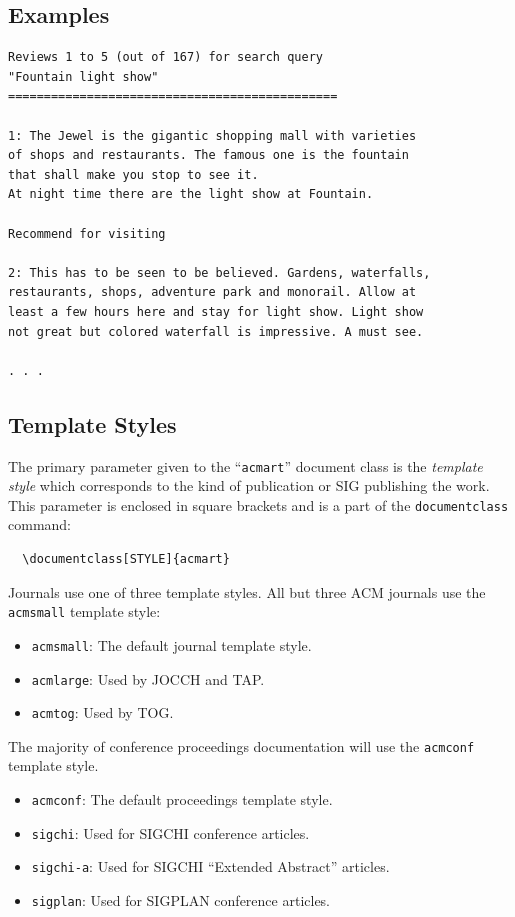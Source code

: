 \documentclass[sigconf,nonacm=true]{acmart}
\begin{document}
\subsection{Examples}
\begin{verbatim}
Reviews 1 to 5 (out of 167) for search query 
"Fountain light show"
==============================================

1: The Jewel is the gigantic shopping mall with varieties
of shops and restaurants. The famous one is the fountain 
that shall make you stop to see it.  
At night time there are the light show at Fountain.

Recommend for visiting

2: This has to be seen to be believed. Gardens, waterfalls,
restaurants, shops, adventure park and monorail. Allow at 
least a few hours here and stay for light show. Light show 
not great but colored waterfall is impressive. A must see.

. . .
\end{verbatim}



\iffalse
\subsection{Template Styles}

The primary parameter given to the ``\verb|acmart|'' document class is
the {\itshape template style} which corresponds to the kind of publication
or SIG publishing the work. This parameter is enclosed in square
brackets and is a part of the {\verb|documentclass|} command:
\begin{verbatim}
  \documentclass[STYLE]{acmart}
\end{verbatim}

Journals use one of three template styles. All but three ACM journals
use the {\verb|acmsmall|} template style:
\begin{itemize}
\item {\verb|acmsmall|}: The default journal template style.
\item {\verb|acmlarge|}: Used by JOCCH and TAP.
\item {\verb|acmtog|}: Used by TOG.
\end{itemize}

The majority of conference proceedings documentation will use the {\verb|acmconf|} template style.
\begin{itemize}
\item {\verb|acmconf|}: The default proceedings template style.
\item{\verb|sigchi|}: Used for SIGCHI conference articles.
\item{\verb|sigchi-a|}: Used for SIGCHI ``Extended Abstract'' articles.
\item{\verb|sigplan|}: Used for SIGPLAN conference articles.
\end{itemize}
\end{document}
